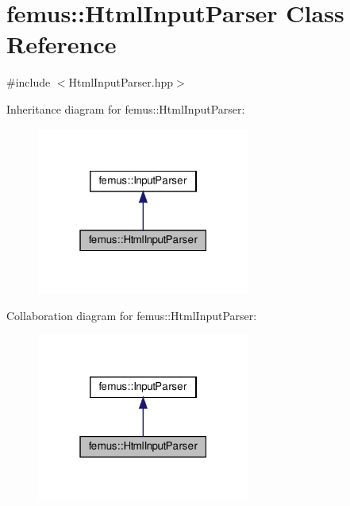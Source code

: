 \hypertarget{classfemus_1_1_html_input_parser}{}\section{femus\+:\+:Html\+Input\+Parser Class Reference}
\label{classfemus_1_1_html_input_parser}


{\ttfamily \#include $<$Html\+Input\+Parser.\+hpp$>$}



Inheritance diagram for femus\+:\+:Html\+Input\+Parser\+:
\nopagebreak
\begin{figure}[H]
\begin{center}
\leavevmode
\includegraphics[width=199pt]{classfemus_1_1_html_input_parser__inherit__graph}
\end{center}
\end{figure}


Collaboration diagram for femus\+:\+:Html\+Input\+Parser\+:
\nopagebreak
\begin{figure}[H]
\begin{center}
\leavevmode
\includegraphics[width=199pt]{classfemus_1_1_html_input_parser__coll__graph}
\end{center}
\end{figure}
